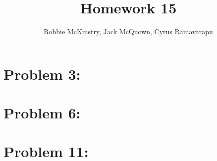 \documentclass[12pt]{article}
\begin{document}
\title{Homework 15}
\author{Robbie McKinstry, Jack McQuown, Cyrus Ramavarapu}
\renewcommand{\today}{5 October 2016}
\renewcommand{\baselinestretch}{1.5}
\maketitle

\section*{Problem 3:}
\section*{Problem 6:}
\section*{Problem 11:}
\end{document}
